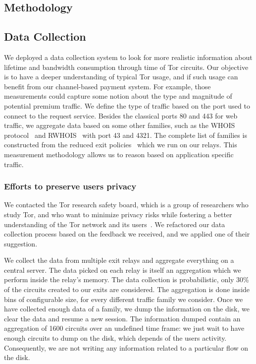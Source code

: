 \subsection{Methodology}
\subsection{Data Collection}
\label{subsec:datacollection}

We deployed a data collection system to look for more realistic information about lifetime and bandwidth consumption through time of Tor circuits. Our objective is to have a deeper understanding of typical Tor usage, and if such usage can benefit from our channel-based payment system. For example, those measurements could capture some notion about the type and magnitude of potential premium traffic. We define the type of traffic based on the port used to connect to the request service. Besides the classical ports 80 and 443 for web traffic, we aggregate data based on some other families, such as the WHOIS protocol~\cite{rfc3912} and RWHOIS~\cite{rfc2167} with port 43 and 4321. The complete list of families is constructed from the reduced exit policies~\cite{reducedexitpolicies} which we run on our relays. This measurement methodology allows us to reason based on application specific traffic.

\subsubsection{Efforts to preserve users privacy}

We contacted the Tor research safety board, which is a group of researchers who study Tor, and who want to minimize privacy risks while fostering a better understanding of the Tor network and its users~\cite{torsafety}. We refactored our data collection process based on the feedback we received, and we applied one of their suggestion.

We collect the data from multiple exit relays and aggregate everything on a central server. The data picked on each relay is itself an aggregation which we perform inside the relay's memory. The data collection is probabilistic, only 30\% of the circuits created to our exits are considered. The aggregation is done inside bins of configurable size, for every different traffic family we consider. Once we have collected enough data of a family, we dump the information on the disk, we clear the data and resume a new session. The information dumped contain an aggregation of 1600 circuits over an undefined time frame: we just wait to have enough circuits to dump on the disk, which depends of the users activity. Consequently, we are not writing any information related to a particular flow on the disk.

